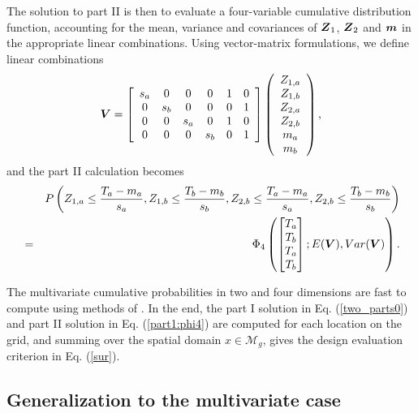 \documentclass[aoas]{imsart}
\begin{document}
The solution to part II is then to evaluate a four-variable cumulative distribution function, accounting for the mean, variance and covariances of ${\boldsymbol Z}_1$, ${\boldsymbol Z}_2$ and ${\boldsymbol m}$ in the appropriate linear combinations. Using vector-matrix formulations, we define linear combinations
\begin{equation}\label{Vcomb}
    \bV=\left[
    \begin{array}{cccccc}
        s_a & 0 & 0 & 0 & 1 & 0 \\
         0 & s_b & 0 & 0 & 0 & 1 \\
         0 & 0 & s_a & 0 & 1 & 0\\
         0 & 0 & 0 & s_b & 0 & 1\\
    \end{array}
    \right] 
    \left(
    \begin{array}{cccccc}
         Z_{1,a} \\
         Z_{1,b} \\
         Z_{2,a} \\
         Z_{2,b} \\
         m_{a} \\
         m_{b}
    \end{array}
    \right),
\end{equation}
and the part II calculation becomes
\begin{eqnarray}\label{part1:phi4}
&& P \left( Z_{1,a} \leq \frac{T_a-m_{a}}{s_{a}}, 
Z_{1,b} \leq \frac{T_b-m_{b}}{s_{b}},Z_{2,b} \leq \frac{T_a-m_{a}}{s_{a}}, 
Z_{2,b} \leq \frac{T_b-m_{b}}{s_{b}} \right)  \\
&=&  \Phi_4 
\begin{pmatrix} 
\begin{bmatrix} T_a\\
T_b \\
T_a \\
T_b
\end{bmatrix};
E( \bV),Var(\bV)
\end{pmatrix} \nonumber.
\end{eqnarray}

The multivariate cumulative probabilities in two and four dimensions are fast to compute using methods of \cite{genz2009computation}.
In the end, the part I solution in Eq. (\ref{two_parts0}) and part II solution in Eq. (\ref{part1:phi4}) are computed for each location on the grid, and summing over the spatial domain $x \in \mathcal{M}_g$, gives the design evaluation criterion in Eq. (\ref{sur}).


\subsection{Generalization to the multivariate case}
\end{document}
